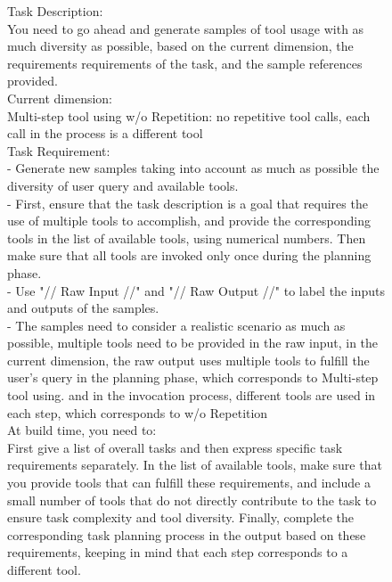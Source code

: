 \begin{figure}[!htb]
\small
\begin{tcolorbox}[
    colback=white, 
    colframe=blue1, 
    boxrule=0.5mm,
    arc=0mm,
    outer arc=0mm,
    title=Missing Necessary Tools: Multi-step w/o Repetition - Generation Prompt
]
Task Description:\\
You need to go ahead and generate samples of tool usage with as much diversity as possible, based on the current dimension, the requirements requirements of the task, and the sample references provided.\\

Current dimension:\\
Multi-step tool using w/o Repetition: no repetitive tool calls, each call in the process is a different tool\\

Task Requirement:\\
- Generate new samples taking into account as much as possible the diversity of user query and available tools.\\
- First, ensure that the task description is a goal that requires the use of multiple tools to accomplish, and provide the corresponding tools in the list of available tools, using numerical numbers. Then make sure that all tools are invoked only once during the planning phase.\\
- Use "// Raw Input //" and "// Raw Output //" to label the inputs and outputs of the samples.\\
- The samples need to consider a realistic scenario as much as possible, multiple tools need to be provided in the raw input, in the current dimension, the raw output uses multiple tools to fulfill the user's query in the planning phase, which corresponds to Multi-step tool using. and in the invocation process, different tools are used in each step, which corresponds to w/o Repetition\\

At build time, you need to:\\
First give a list of overall tasks and then express specific task requirements separately. In the list of available tools, make sure that you provide tools that can fulfill these requirements, and include a small number of tools that do not directly contribute to the task to ensure task complexity and tool diversity. Finally, complete the corresponding task planning process in the output based on these requirements, keeping in mind that each step corresponds to a different tool.\\


\end{tcolorbox}
\end{figure}
